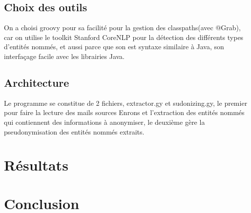 \documentclass{article}
\begin{document}
\subsection{Choix des outils}
On a choisi groovy pour sa facilité pour la gestion des classpaths(avec @Grab),  car on utilise le toolkit Stanford CoreNLP pour la détection des différents types d'entités nommés, et aussi parce que son est syntaxe similaire à Java, son interfaçage facile avec les librairies Java.


\subsection{Architecture}
Le programme se constitue de 2 fichiers, extractor.gy et sudonizing.gy, le premier pour faire la lecture des mails sources Enrons et l'extraction des entités nommés qui contiennent des informations à anonymiser, le deuxième gère la pseudonymisation des entités nommés extraits. 


\section{Résultats}

\section{Conclusion}
\end{document}
